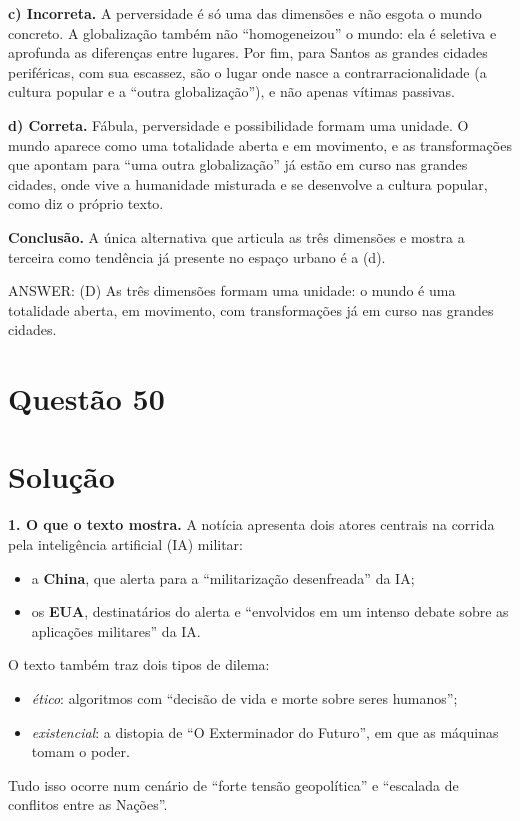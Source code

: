 \documentclass{article}%
\begin{document}
\textbf{c) Incorreta.} A perversidade é só uma das dimensões e não esgota o mundo concreto. A globalização também não ``homogeneizou'' o mundo: ela é seletiva e aprofunda as diferenças entre lugares. Por fim, para Santos as grandes cidades periféricas, com sua escassez, são o lugar onde nasce a contrarracionalidade (a cultura popular e a ``outra globalização''), e não apenas vítimas passivas.

\textbf{d) Correta.} Fábula, perversidade e possibilidade formam uma unidade. O mundo aparece como uma totalidade aberta e em movimento, e as transformações que apontam para ``uma outra globalização'' já estão em curso nas grandes cidades, onde vive a humanidade misturada e se desenvolve a cultura popular, como diz o próprio texto.

\textbf{Conclusão.} A única alternativa que articula as três dimensões e mostra a terceira como tendência já presente no espaço urbano é a (d).

ANSWER: (D) As três dimensões formam uma unidade: o mundo é uma totalidade aberta, em movimento, com transformações já em curso nas grandes cidades.%
\newpage%
\section*{Questão 50}

\section*{Solução}

\textbf{1. O que o texto mostra.} A notícia apresenta dois atores centrais na corrida pela inteligência artificial (IA) militar:
\begin{itemize}
  \item a \textbf{China}, que alerta para a ``militarização desenfreada'' da IA;
  \item os \textbf{EUA}, destinatários do alerta e ``envolvidos em um intenso debate sobre as aplicações militares'' da IA.
\end{itemize}
O texto também traz dois tipos de dilema:
\begin{itemize}
  \item \emph{ético}: algoritmos com ``decisão de vida e morte sobre seres humanos'';
  \item \emph{existencial}: a distopia de ``O Exterminador do Futuro'', em que as máquinas tomam o poder.
\end{itemize}
Tudo isso ocorre num cenário de ``forte tensão geopolítica'' e ``escalada de conflitos entre as Nações''.
\end{document}
